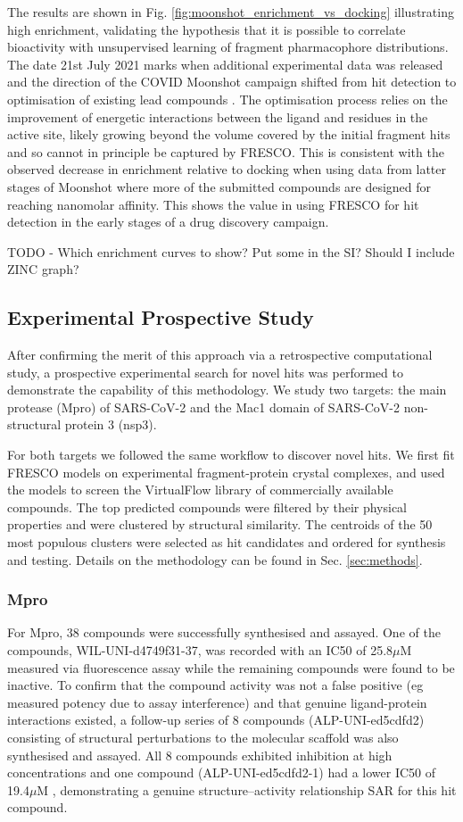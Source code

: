 \documentclass[journal=jacsat,manuscript=article]{achemso}
\newcommand{\uM}{$\mu$M }
\begin{document}
The results are shown in Fig. \ref{fig:moonshot_enrichment_vs_docking} illustrating high enrichment, validating the hypothesis that it is possible to correlate bioactivity with unsupervised learning of fragment pharmacophore distributions. The date 21st July 2021 marks when additional experimental data was released and the direction of the COVID Moonshot campaign shifted from hit detection to optimisation of existing lead compounds \cite{Moonshot2021DataRelease}. The optimisation process relies on the improvement of energetic interactions between the ligand and residues in the active site, likely growing beyond the volume covered by the initial fragment hits and so cannot in principle be captured by FRESCO. This is consistent with the observed decrease in enrichment relative to docking when using data from latter stages of Moonshot where more of the submitted compounds are designed for reaching nanomolar affinity. This shows the value in using FRESCO for hit detection in the early stages of a drug discovery campaign.

TODO - Which enrichment curves to show? Put some in the SI? Should I include ZINC graph?

\subsection{Experimental Prospective Study}
After confirming the merit of this approach via a retrospective computational study, a prospective experimental search for novel hits was performed to demonstrate the capability of this methodology. We study two targets: the main protease (Mpro) of SARS-CoV-2 and the Mac1 domain of SARS-CoV-2 non-structural protein 3 (nsp3). 

For both targets we followed the same workflow to discover novel hits. We first fit FRESCO models on experimental fragment-protein crystal complexes, and used the models to screen the VirtualFlow \cite{Gorgulla2020VirtualFlow} library of commercially available compounds. The top predicted compounds were filtered by their physical properties and were clustered by structural similarity. The centroids of the 50 most populous clusters were selected as hit candidates and ordered for synthesis and testing. Details on the methodology can be found in Sec. \ref{sec:methods}.

\subsubsection{Mpro}
For Mpro, 38 compounds were successfully synthesised and assayed. One of the compounds, WIL-UNI-d4749f31-37, was recorded with an IC50 of 25.8\uM measured via fluorescence assay while the remaining compounds were found to be inactive. To confirm that the compound activity was not a false positive (eg measured potency due to assay interference) and that genuine ligand-protein interactions existed, a follow-up series of 8 compounds (ALP-UNI-ed5cdfd2) consisting of structural perturbations to the molecular scaffold was also synthesised and assayed. All 8 compounds exhibited inhibition at high concentrations and one compound (ALP-UNI-ed5cdfd2-1) had a lower IC50 of 19.4\uM, demonstrating a genuine structure–activity relationship SAR for this hit compound.
\end{document}
